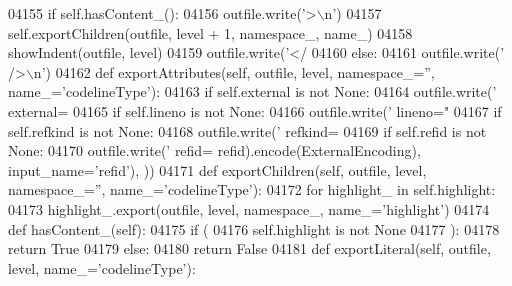 \begin{DoxyCode}
{{{{{{{{{{{{{{{{{{{{{{{{{{{{{{{{{{{{{{{{{{{{{{{{{{{{{{{{{{{{{{{{{{{{{{{{{{{{{{{{{{{{{{{{{{{{{{{{{{{{{{{{{{{{{{{{{{{{{{{{{{{{{{{{{{{{{{{{{{{{{{{{{{{{{{{{{{{{{{{{{{{{{{{{{{{{{{{{{{{{{{{{{{{{{{{{{{{{{{{{{{{{{{{{{{{{{{{{{{{{{{{{{{{{{{{{{{{{{{{{{{{{{{{{{{{{{{{{{{{{{{{{{{{{04155         \textcolor{keywordflow}{if} self.hasContent_():
04156             outfile.write(\textcolor{stringliteral}{'>\(\backslash\)n'})
04157             self.exportChildren(outfile, level + 1, namespace\_, name\_)
04158             showIndent(outfile, level)
04159             outfile.write(\textcolor{stringliteral}{'</%
04160         \textcolor{keywordflow}{else}:
04161             outfile.write(\textcolor{stringliteral}{' />\(\backslash\)n'})
04162     \textcolor{keyword}{def }exportAttributes(self, outfile, level, namespace\_='', name\_='codelineType'):
04163         \textcolor{keywordflow}{if} self.external \textcolor{keywordflow}{is} \textcolor{keywordflow}{not} \textcolor{keywordtype}{None}:
04164             outfile.write(\textcolor{stringliteral}{' external=%
04165         \textcolor{keywordflow}{if} self.lineno \textcolor{keywordflow}{is} \textcolor{keywordflow}{not} \textcolor{keywordtype}{None}:
04166             outfile.write(\textcolor{stringliteral}{' lineno="%
04167         \textcolor{keywordflow}{if} self.refkind \textcolor{keywordflow}{is} \textcolor{keywordflow}{not} \textcolor{keywordtype}{None}:
04168             outfile.write(\textcolor{stringliteral}{' refkind=%
04169         \textcolor{keywordflow}{if} self.refid \textcolor{keywordflow}{is} \textcolor{keywordflow}{not} \textcolor{keywordtype}{None}:
04170             outfile.write(\textcolor{stringliteral}{' refid=%
      refid).encode(ExternalEncoding), input\_name=\textcolor{stringliteral}{'refid'}), ))
04171     \textcolor{keyword}{def }exportChildren(self, outfile, level, namespace\_='', name\_='codelineType'):
04172         \textcolor{keywordflow}{for} highlight\_ \textcolor{keywordflow}{in} self.highlight:
04173             highlight\_.export(outfile, level, namespace\_, name\_=\textcolor{stringliteral}{'highlight'})
04174     \textcolor{keyword}{def }hasContent_(self):
04175         \textcolor{keywordflow}{if} (
04176             self.highlight \textcolor{keywordflow}{is} \textcolor{keywordflow}{not} \textcolor{keywordtype}{None}
04177             ):
04178             \textcolor{keywordflow}{return} \textcolor{keyword}{True}
04179         \textcolor{keywordflow}{else}:
04180             \textcolor{keywordflow}{return} \textcolor{keyword}{False}
04181     \textcolor{keyword}{def }exportLiteral(self, outfile, level, name\_='codelineType'):
}}}}}}}}}}}}}}}}}}}}}}}}}}}}}}}}}}}}}}}}}}}}}}}}}}}}}}}}}}}}}}}}}}}}}}}}}}}}}}}}}}}}}}}}}}}}}}}}}}}}}}}}}}}}}}}}}}}}}}}}}}}}}}}}}}}}}}}}}}}}}}}}}}}}}}}}}}}}}}}}}}}}}}}}}}}}}}}}}}}}}}}}}}}}}}}}}}}}}}}}}}}}}}}}}}}}}}}}}}}}}}}}}}}}}}}}}}}}}}}}}}}}}}}}}}}}}}}}}}}}}}}}}}}}}}}}}
\end{DoxyCode}
